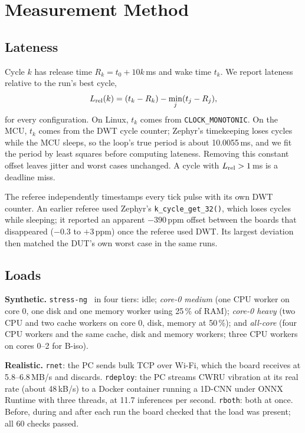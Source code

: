 \section{Measurement Method}
\label{sec:method}

\subsection{Lateness}
Cycle $k$ has release time $R_k = t_0 + 10k$\,ms and wake time $t_k$. We report lateness relative to the run's best cycle,
\begin{equation}
L_{\mathrm{rel}}(k) = (t_k - R_k) - \min_j (t_j - R_j),
\end{equation}
for every configuration. On Linux, $t_k$ comes from \texttt{CLOCK\_MONOTONIC}. On the MCU, $t_k$ comes from the DWT cycle counter; Zephyr's timekeeping loses cycles while the MCU sleeps, so the loop's true period is about 10.0055\,ms, and we fit the period by least squares before computing lateness. Removing this constant offset leaves jitter and worst cases unchanged. A cycle with $L_{\mathrm{rel}} > 1$\,ms is a deadline miss.

The referee independently timestamps every tick pulse with its own DWT counter. An earlier referee used Zephyr's \texttt{k\_cycle\_get\_32()}, which loses cycles while sleeping; it reported an apparent $-390$\,ppm offset between the boards that disappeared ($-0.3$ to $+3$\,ppm) once the referee used DWT. Its largest deviation then matched the DUT's own worst case in the same runs.

\subsection{Loads}
\textbf{Synthetic.} \texttt{stress-ng}~\cite{stressng} in four tiers: idle; \emph{core-0 medium} (one CPU worker on core 0, one disk and one memory worker using 25\,\% of RAM); \emph{core-0 heavy} (two CPU and two cache workers on core 0, disk, memory at 50\,\%); and \emph{all-core} (four CPU workers and the same cache, disk and memory workers; three CPU workers on cores 0--2 for B-iso).

\textbf{Realistic.} \texttt{rnet}: the PC sends bulk TCP over Wi-Fi, which the board receives at 5.8--6.8\,MB/s and discards. \texttt{rdeploy}: the PC streams CWRU vibration at its real rate (about 48\,kB/s) to a Docker container running a 1D-CNN under ONNX Runtime with three threads, at 11.7 inferences per second. \texttt{rboth}: both at once. Before, during and after each run the board checked that the load was present; all 60 checks passed.

